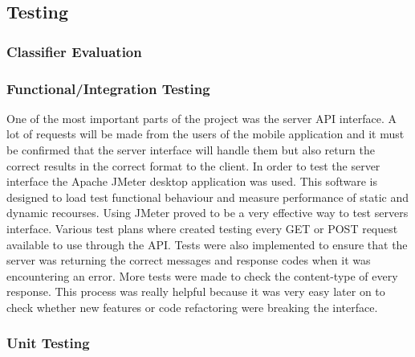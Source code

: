 \subsection{Testing} 
\subsubsection{Classifier Evaluation} 
\subsubsection{Functional/Integration Testing}
One of the most important parts of the project was the server API interface. A lot of requests will 
be made from the users of the mobile application and it must be confirmed that the server interface 
will handle them but also return the correct results in the correct format to the client. In order 
to test the server interface the Apache JMeter desktop application was used. This software is 
designed to load test functional behaviour and measure performance of static and dynamic recourses. 
Using JMeter proved to be a very effective way to test servers interface. Various test plans where 
created testing every GET or POST request available to use through the API. Tests were also 
implemented to ensure that the server was returning the correct messages and response codes when it 
was encountering an error. More tests were made to check the content-type of every response. This 
process was really helpful because it was very easy later on to check whether new features or code 
refactoring were breaking the interface. 

\subsubsection{Unit Testing} 


